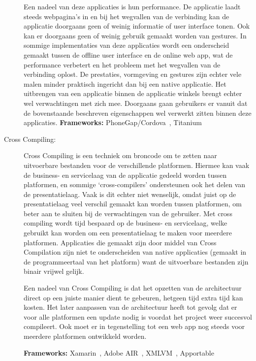 \begin{description}
Een nadeel van deze applicaties is hun performance. De applicatie laadt steeds webpagina's in en bij het wegvallen van de verbinding kan de applicatie doorgaans geen of weinig informatie of user interface tonen. Ook kan er doorgaans geen of weinig gebruik gemaakt worden van gestures. In sommige implementaties van deze applicaties wordt een onderscheid gemaakt tussen de offline user interface en de online web app, wat de performance verbetert en het probleem met het wegvallen van de verbinding oplost. De prestaties, vormgeving en gestures zijn echter vele malen minder praktisch ingericht dan bij een native applicatie. Het uitbrengen van een applicatie binnen de applicatie winkels brengt echter wel verwachtingen met zich mee. Doorgaans gaan gebruikers er vanuit dat de bovenstaande beschreven eigenschappen wel verwerkt zitten binnen deze applicaties.   
\textbf{Frameworks:} PhoneGap/Cordova~\cite{cordova}, Titanium~\cite{titanium}
    
\item[Cross Compiling: ] Cross Compiling is een techniek om broncode om te zetten naar uitvoerbare bestanden voor de verschillende platformen. Hiermee kan vaak de business- en servicelaag van de applicatie gedeeld worden tussen platformen, en sommige `cross-compilers' ondersteunen ook het delen van de presentatielaag. Vaak is dit echter niet wenselijk, omdat juist op de presentatielaag veel verschil gemaakt kan worden tussen platformen, om beter aan te sluiten bij de verwachtingen van de gebruiker. Met cross compiling wordt tijd bespaard op de business- en servicelaag, welke gebruikt kan worden om een presentatielaag te maken voor meerdere platformen. Applicaties die gemaakt zijn door middel van Cross Compilation zijn niet te onderscheiden van native applicaties (gemaakt in de programmeertaal van het platform) want de uitvoerbare bestanden zijn binair vrijwel gelijk.
    
Een nadeel van Cross Compiling is dat het opzetten van de architectuur direct op een juiste manier dient te gebeuren, hetgeen tijd extra tijd kan kosten. Het later aanpassen van de architectuur heeft tot gevolg dat er voor alle platformen een update nodig is voordat het project weer succesvol compileert. Ook moet er in tegenstelling tot een web app nog steeds voor meerdere platformen ontwikkeld worden.
    
\textbf{Frameworks:} Xamarin~\cite{xamarin}, Adobe AIR~\cite{adobeair}, XMLVM~\cite{xmlvm}, Apportable~\cite{apportable}
\end{description}

